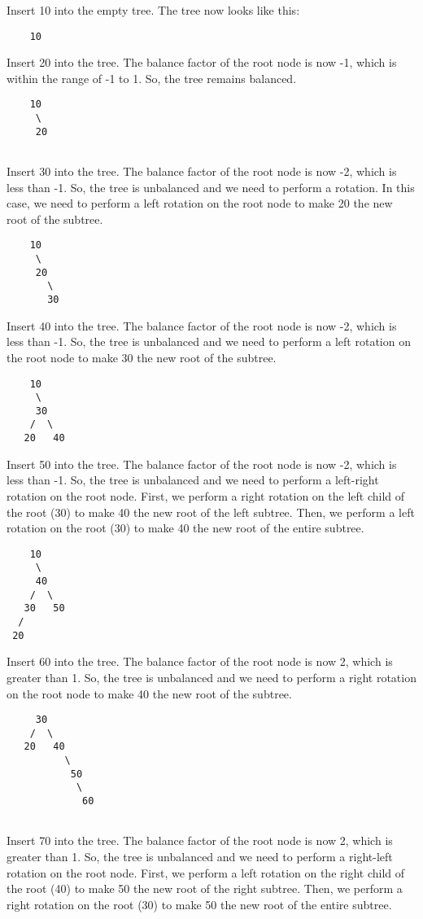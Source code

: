 \documentclass{article}
\begin{document}
Insert 10 into the empty tree. The tree now looks like this:
\begin{lstlisting}
    10

\end{lstlisting}
Insert 20 into the tree. The balance factor of the root node is now -1, which is within the range of -1 to 1. So, the tree remains balanced.
\begin{lstlisting}
    10
     \
     20
  
\end{lstlisting}
Insert 30 into the tree. The balance factor of the root node is now -2, which is less than -1. So, the tree is unbalanced and we need to perform a rotation. In this case, we need to perform a left rotation on the root node to make 20 the new root of the subtree.
\begin{lstlisting}
    10
     \
     20
       \
       30

\end{lstlisting}
Insert 40 into the tree. The balance factor of the root node is now -2, which is less than -1. So, the tree is unbalanced and we need to perform a left rotation on the root node to make 30 the new root of the subtree.
\begin{lstlisting}
    10
     \
     30
    /  \
   20   40

\end{lstlisting}
Insert 50 into the tree. The balance factor of the root node is now -2, which is less than -1. So, the tree is unbalanced and we need to perform a left-right rotation on the root node. First, we perform a right rotation on the left child of the root (30) to make 40 the new root of the left subtree. Then, we perform a left rotation on the root (30) to make 40 the new root of the entire subtree.
\begin{lstlisting}
    10
     \
     40
    /  \
   30   50
  /
 20

\end{lstlisting}
Insert 60 into the tree. The balance factor of the root node is now 2, which is greater than 1. So, the tree is unbalanced and we need to perform a right rotation on the root node to make 40 the new root of the subtree.
\begin{lstlisting}
     30
    /  \
   20   40
          \
           50
            \
             60
  
\end{lstlisting}
Insert 70 into the tree. The balance factor of the root node is now 2, which is greater than 1. So, the tree is unbalanced and we need to perform a right-left rotation on the root node. First, we perform a left rotation on the right child of the root (40) to make 50 the new root of the right subtree. Then, we perform a right rotation on the root (30) to make 50 the new root of the entire subtree.
\end{document}
